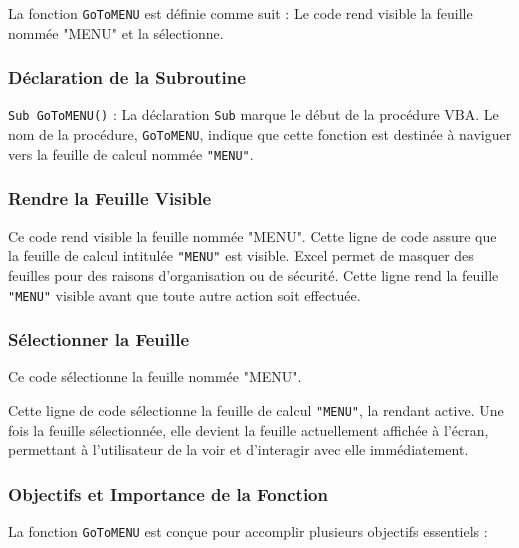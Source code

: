 \documentclass[a4paper, oneside, 12pt, final]{extreport}
\begin{document}
La fonction \texttt{GoToMENU} est définie comme suit :
Le code rend visible la feuille nommée "MENU" et la sélectionne.
\subsubsection{Déclaration de la Subroutine}

\texttt{Sub GoToMENU()} : La déclaration \texttt{Sub} marque le début de la procédure VBA. Le nom de la procédure, \texttt{GoToMENU}, indique que cette fonction est destinée à naviguer vers la feuille de calcul nommée \texttt{"MENU"}.

\subsubsection{Rendre la Feuille Visible}
Ce code rend visible la feuille nommée "MENU".
Cette ligne de code assure que la feuille de calcul intitulée \texttt{"MENU"} est visible. Excel permet de masquer des feuilles pour des raisons d'organisation ou de sécurité. Cette ligne rend la feuille \texttt{"MENU"} visible avant que toute autre action soit effectuée.

\subsubsection{Sélectionner la Feuille}
Ce code sélectionne la feuille nommée "MENU".

Cette ligne de code sélectionne la feuille de calcul \texttt{"MENU"}, la rendant active. Une fois la feuille sélectionnée, elle devient la feuille actuellement affichée à l'écran, permettant à l'utilisateur de la voir et d'interagir avec elle immédiatement.

\subsubsection{Objectifs et Importance de la Fonction}

La fonction \texttt{GoToMENU} est conçue pour accomplir plusieurs objectifs essentiels :
\end{document}
